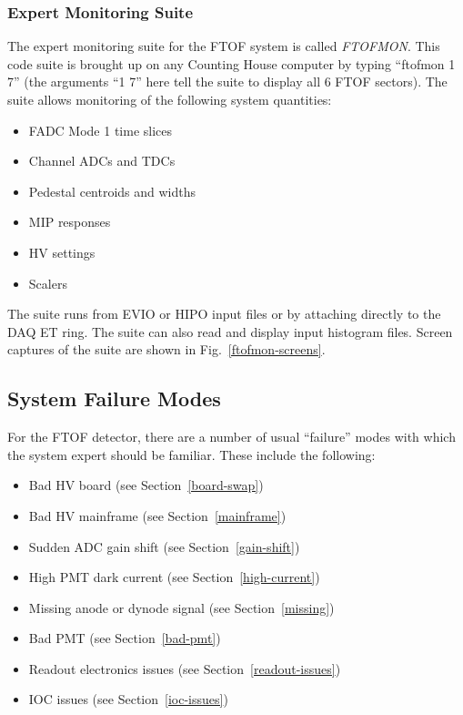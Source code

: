 \documentclass[12pt]{article}
\begin{document}
\subsubsection{Expert Monitoring Suite}
\label{ftofmon}

The expert monitoring suite for the FTOF system is called {\it FTOFMON}. This code 
suite is brought up on any Counting House computer by typing ``ftofmon 1 7'' (the 
arguments ``1 7'' here tell the suite to display all 6 FTOF sectors). The suite allows 
monitoring of the following system quantities:

\begin{itemize}
\item FADC Mode 1 time slices
\item Channel ADCs and TDCs
\item Pedestal centroids and widths
\item MIP responses
\item HV settings
\item Scalers
\end{itemize}

The suite runs from EVIO or HIPO input files or by attaching directly to the DAQ ET 
ring. The suite can also read and display input histogram files. Screen captures of 
the suite are shown in Fig.~\ref{ftofmon-screens}. 

\subsection{System Failure Modes}
\label{repairs}

For the FTOF detector, there are a number of usual ``failure'' modes with which the 
system expert should be familiar. These include the following:

\begin{itemize}
\item Bad HV board (see Section~\ref{board-swap})
\item Bad HV mainframe (see Section~\ref{mainframe})
\item Sudden ADC gain shift (see Section~\ref{gain-shift})
\item High PMT dark current (see Section~\ref{high-current})
\item Missing anode or dynode signal (see Section~\ref{missing})
\item Bad PMT (see Section~\ref{bad-pmt})
\item Readout electronics issues (see Section~\ref{readout-issues})
\item IOC issues (see Section~\ref{ioc-issues})
\end{itemize}
\end{document}
